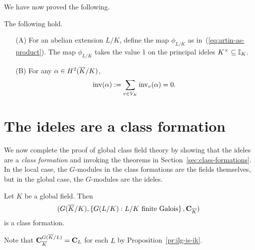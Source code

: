We have now proved the following.
\begin{thm}
The following hold.
\begin{enumerate}
\item[(A)]
For an abelian extension $L/K$, define the map $\phi_{L/K}$ as in~(\ref{eq:artin-as-product}). 
The map $\phi_{L/K}$ takes the value 1 on the principal ideles $K^{\times}\subseteq \mathbb{I}_K$.
\item[(B)]
For any $\alpha\in H^2(\overline{K}/K)$,
\[
\operatorname{inv}(\alpha):=\sum_{v\in V_K} \operatorname{inv}_v(\alpha)=0.
\]
\end{enumerate}
\end{thm}
\section{The ideles are a class formation}
We now complete the proof of global class field theory by showing that the ideles are a {\it class formation} and invoking the theorems in Section~\ref{sec:class-formations}. In the local case, the $G$-modules in the class formations are the fields themselves, but in the global case, the $G$-modules are the ideles.
\begin{thm}
Let $K$ be a global field. Then 
\[(G(\overline{K}/K),\left\{{G(L/K)}:{L/K\text{ finite Galois}}\right\},\mathbf C_{\overline{K}})\]
is a class formation.
\end{thm}
Note that $\mathbf C_{\overline{K}}^{G(\overline{K}/L)}=\mathbf C_L$ for each $L$ by Proposition~\ref{pr:ilg-is-ik}.
